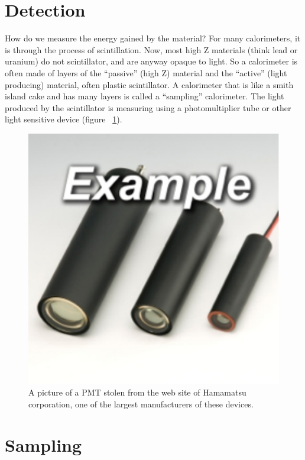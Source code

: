 \;

\section{Detection}

\noindent
How do we measure the energy gained by the material? For many calorimeters, it is through the process of scintillation. Now, most high Z materials (think lead or uranium) do not scintillator, and are anyway opaque to light. So a calorimeter is often made of layers of the ``passive'' (high Z) material and the ``active'' (light producing) material, often plastic scintillator. A calorimeter that is like a smith island cake and has many layers is called a ``sampling'' calorimeter. The light produced by the scintillator is measuring using a photomultiplier tube or other light sensitive device (figure ~\ref{fig:cal5}).


\;
\;

\begin{figure}[h]
\centering\includegraphics[scale=0.5]{./calorimetry/Pictures/fig5.pdf}
\caption{A picture of a PMT stolen from the web site of Hamamatsu corporation, one of the largest manufacturers of these devices.}
\label{fig:cal5}
\end{figure}

\;

\section{Sampling}

